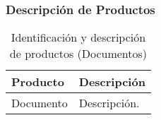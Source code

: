\newpage
\subsubsection{Descripción de Productos}

\begin{table}[H]
\centering
	\begin{tabular}{p{5cm}|p{11cm}}
		\hline
			\textbf{Producto} & \textbf{Descripción}\\ %
		\hline\hline %
			{Documento} & {Descripción.}\\ %
		\hline
	\end{tabular}
\caption{Identificación y descripción de productos (Documentos)}
\end{table}

